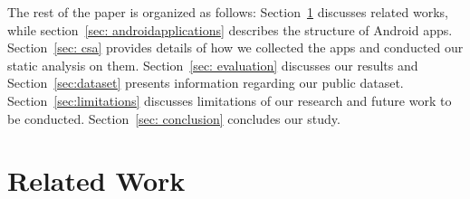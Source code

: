 \documentclass{sig-alternate}
\newcommand{\todo}[1]{\textcolor{cyan}{\textbf{[#1]}}}
\newcommand{\dan}[1]{\textcolor{blue}{{\it [Dan says: #1]}}}
\begin{document}



The rest of the paper is organized as follows: Section~\ref{sec: relatedwork} discusses related works, while section~\ref{sec: androidapplications} describes the structure of Android apps. Section~\ref{sec: csa} provides details of how we collected the apps and conducted our static analysis on them. Section~\ref{sec: evaluation} discusses our results and Section~\ref{sec:dataset} presents information regarding our public dataset. Section~\ref{sec:limitations} discusses limitations of our research and future work to be conducted. Section~\ref{sec: conclusion} concludes our study.

\section{Related Work}
\label{sec: relatedwork}
\end{document}
